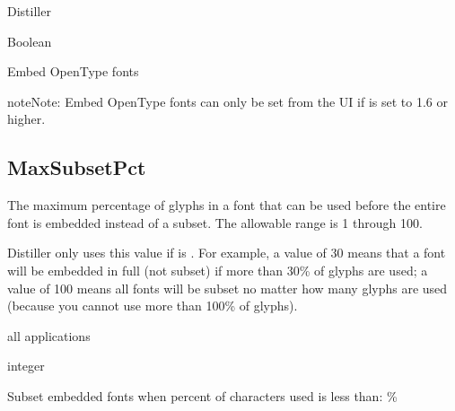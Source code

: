 \documentclass[letterpaper,12pt,english,openany,oneside]{sphinxmanual}
\begin{document}
Distiller

\label{\detokenize{PDF_Create_CommonSettings:type-69}}

Boolean

\label{\detokenize{PDF_Create_CommonSettings:ui-name-56}}

Embed OpenType fonts

\begin{sphinxadmonition}{note}{Note:}
Embed OpenType fonts can only be set from the UI if  is set to 1.6 or higher.
\end{sphinxadmonition}
\label{\detokenize{PDF_Create_CommonSettings:default-value-66}}

\begin{sphinxVerbatim}[commandchars=\\\{\}]
\end{sphinxVerbatim}




\subsection{MaxSubsetPct}
\label{\detokenize{PDF_Create_CommonSettings:maxsubsetpct}}
The maximum percentage of glyphs in a font that can be used before the entire font is embedded instead of a subset. The allowable range is 1 through 100.

Distiller only uses this value if  is  . For example, a value of 30 means that a font will be embedded in full (not subset) if more than 30\% of glyphs are used; a value of 100 means all fonts will be subset no matter how many glyphs are used (because you cannot use more than 100\% of glyphs).

\label{\detokenize{PDF_Create_CommonSettings:supported-by-71}}

all applications

\label{\detokenize{PDF_Create_CommonSettings:type-70}}

integer

\label{\detokenize{PDF_Create_CommonSettings:ui-name-57}}

Subset embedded fonts when percent of characters used is less than:  \%
\end{document}
